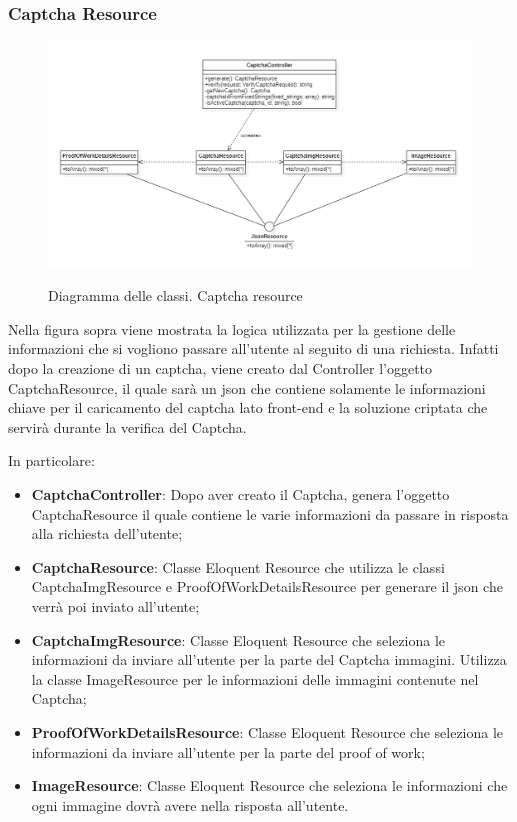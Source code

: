 \subsubsection{Captcha Resource}
\begin{figure}[H]
	\centering
	\includegraphics[scale = 0.6]{img/captcha_resource.png}\\
	\caption{Diagramma delle classi. Captcha resource}
\end{figure}

Nella figura sopra viene mostrata la logica utilizzata per la gestione delle informazioni che si vogliono passare all'utente al seguito di una richiesta. Infatti dopo la creazione di un captcha, viene creato dal Controller l'oggetto CaptchaResource, il quale sarà un json che contiene solamente le informazioni chiave per il caricamento del captcha lato front-end e la soluzione criptata che servirà durante la verifica del Captcha.

In particolare:
\begin{itemize}
	\item \textbf{CaptchaController}: Dopo aver creato il Captcha, genera l'oggetto CaptchaResource il quale contiene le varie informazioni da passare in risposta alla richiesta dell'utente;
	\item \textbf{CaptchaResource}: Classe Eloquent Resource che utilizza le classi CaptchaImgResource e ProofOfWorkDetailsResource per generare il json che verrà poi inviato all'utente;
	\item \textbf{CaptchaImgResource}: Classe Eloquent Resource che seleziona le informazioni da inviare all'utente per la parte del Captcha immagini. Utilizza la classe ImageResource per le informazioni delle immagini contenute nel Captcha;
	\item \textbf{ProofOfWorkDetailsResource}: Classe Eloquent Resource che seleziona le informazioni da inviare all'utente per la parte del proof of work;
	\item \textbf{ImageResource}: Classe Eloquent Resource che seleziona le informazioni che ogni immagine dovrà avere nella risposta all'utente.
\end{itemize}
\newpage

